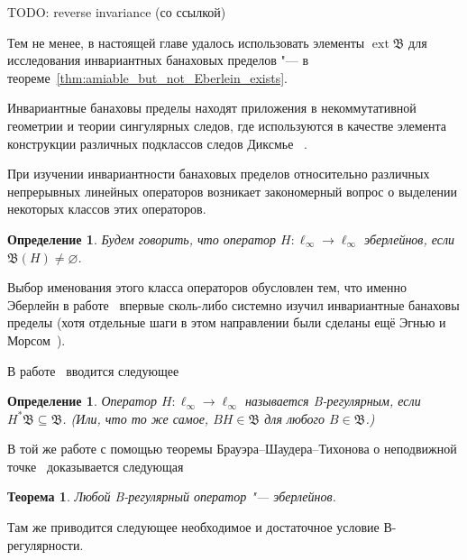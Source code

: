 \documentclass[a4paper,14pt]{article} %
\DeclareMathOperator{\ext}{ext}
\newcommand{\B}{\ensuremath{\mathfrak{B}}}
\theoremstyle{plain}
\newtheorem{theorem}[lemma]{Теорема}
\newtheorem{definition}[lemma]{Определение}
\begin{document}
TODO: reverse invariance (со ссылкой)


Тем не менее, в настоящей главе удалось использовать элементы $\ext\B$ для исследования инвариантных банаховых пределов
"--- в теореме~\ref{thm:amiable_but_not_Eberlein_exists}.


Инвариантные банаховы пределы находят приложения в некоммутативной геометрии
и теории сингулярных следов, где используются в качестве элемента конструкции
различных подклассов следов Диксмье
~\cite{carey2003spectral,lord2012singular,sukochev2015characterization,sukochev2016dixmier}.


При изучении инвариантности банаховых пределов относительно различных непрерывных линейных операторов
возникает закономерный вопрос о выделении некоторых классов этих операторов.

\begin{definition}
	Будем говорить, что оператор $H : \ell_\infty \to \ell_\infty$ \emph{эберлейнов},
	если $\B (H) \ne \varnothing$.
\end{definition}

Выбор именования этого класса операторов обусловлен тем, что именно Эберлейн в работе~\cite{Eberlein}
впервые сколь-либо системно изучил инвариантные банаховы пределы
(хотя отдельные шаги в этом направлении были сделаны ещё Эгнью и Морсом~\cite{agnew1938linear,agnew1938extensions}).

В работе~\cite{alekhno2018invariant} вводится следующее

\begin{definition}
	\label{def:B-regular_operator}
	Оператор $H : \ell_\infty \to \ell_\infty$ называется \emph{B-регулярным},
	если $H^*\B \subseteq \B$.
	(Или, что то же самое, $BH\in\B$ для любого $B\in\B$.)
\end{definition}

В той же работе с помощью теоремы Брауэра--Шаудера--Тихонова о неподвижной точке~\cite[Corollary  17.56]{aliprantis2006infinite}
доказывается следующая
\begin{theorem}
	\label{thm:B-regular_is_Eberlein}
	Любой B-регулярный оператор "--- эберлейнов.
\end{theorem}


Там же приводится следующее необходимое и достаточное условие В-регулярности.
\end{document}
